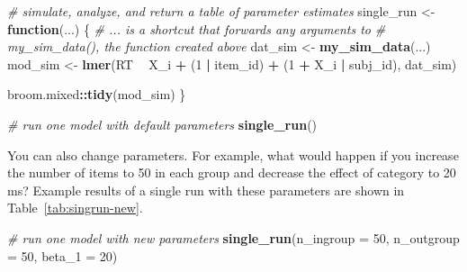 \documentclass[
  english,
  doc,floatsintext]{apa6}
\newenvironment{Shaded}{\begin{snugshade}}{\end{snugshade}}
\newcommand{\CommentTok}[1]{\textcolor[rgb]{0.56,0.35,0.01}{\textit{#1}}}
\newcommand{\ControlFlowTok}[1]{\textcolor[rgb]{0.13,0.29,0.53}{\textbf{#1}}}
\newcommand{\DataTypeTok}[1]{\textcolor[rgb]{0.13,0.29,0.53}{#1}}
\newcommand{\DecValTok}[1]{\textcolor[rgb]{0.00,0.00,0.81}{#1}}
\newcommand{\KeywordTok}[1]{\textcolor[rgb]{0.13,0.29,0.53}{\textbf{#1}}}
\newcommand{\NormalTok}[1]{#1}
\newcommand{\OperatorTok}[1]{\textcolor[rgb]{0.81,0.36,0.00}{\textbf{#1}}}
\newcommand{\StringTok}[1]{\textcolor[rgb]{0.31,0.60,0.02}{#1}}
\begin{document}
\begin{Shaded}
\begin{Highlighting}[]
\CommentTok{# simulate, analyze, and return a table of parameter estimates}
\NormalTok{single_run <-}\StringTok{ }\ControlFlowTok{function}\NormalTok{(...) \{}
  \CommentTok{# ... is a shortcut that forwards any arguments to }
  \CommentTok{# my_sim_data(), the function created above}
\NormalTok{  dat_sim <-}\StringTok{ }\KeywordTok{my_sim_data}\NormalTok{(...)}
\NormalTok{  mod_sim <-}\StringTok{ }\KeywordTok{lmer}\NormalTok{(RT }\OperatorTok{~}\StringTok{ }\NormalTok{X_i }\OperatorTok{+}\StringTok{ }\NormalTok{(}\DecValTok{1} \OperatorTok{|}\StringTok{ }\NormalTok{item_id) }\OperatorTok{+}\StringTok{ }\NormalTok{(}\DecValTok{1} \OperatorTok{+}\StringTok{ }\NormalTok{X_i }\OperatorTok{|}\StringTok{ }\NormalTok{subj_id),}
\NormalTok{                dat_sim)}
  
\NormalTok{  broom.mixed}\OperatorTok{::}\KeywordTok{tidy}\NormalTok{(mod_sim)}
\NormalTok{\}}
\end{Highlighting}
\end{Shaded}

\begin{Shaded}
\begin{Highlighting}[]
\CommentTok{# run one model with default parameters}
\KeywordTok{single_run}\NormalTok{()}
\end{Highlighting}
\end{Shaded}

You can also change parameters. For example, what would happen if you increase the number of items to 50 in each group and decrease the effect of category to 20 ms? Example results of a single run with these parameters are shown in Table~\ref{tab:singrun-new}.

\begin{Shaded}
\begin{Highlighting}[]
\CommentTok{# run one model with new parameters}
\KeywordTok{single_run}\NormalTok{(}\DataTypeTok{n_ingroup =} \DecValTok{50}\NormalTok{, }\DataTypeTok{n_outgroup =} \DecValTok{50}\NormalTok{, }\DataTypeTok{beta_1 =} \DecValTok{20}\NormalTok{)}
\end{Highlighting}
\end{Shaded}
\end{document}
